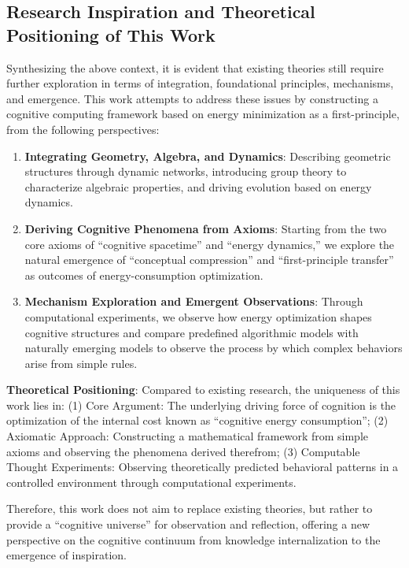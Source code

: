\documentclass[10pt,onecolumn]{article}
\begin{document}
\subsection{Research Inspiration and Theoretical Positioning of This Work}
\label{subsec:research_gaps_positioning}

Synthesizing the above context, it is evident that existing theories still require further exploration in terms of integration, foundational principles, mechanisms, and emergence. This work attempts to address these issues by constructing a cognitive computing framework based on energy minimization as a first-principle, from the following perspectives:
\begin{enumerate}
    \item \textbf{Integrating Geometry, Algebra, and Dynamics}: Describing geometric structures through dynamic networks, introducing group theory to characterize algebraic properties, and driving evolution based on energy dynamics.
    \item \textbf{Deriving Cognitive Phenomena from Axioms}: Starting from the two core axioms of “cognitive spacetime” and “energy dynamics,” we explore the natural emergence of “conceptual compression” and “first-principle transfer” as outcomes of energy-consumption optimization.
    \item \textbf{Mechanism Exploration and Emergent Observations}: Through computational experiments, we observe how energy optimization shapes cognitive structures and compare predefined algorithmic models with naturally emerging models to observe the process by which complex behaviors arise from simple rules.
\end{enumerate}

\textbf{Theoretical Positioning}: Compared to existing research, the uniqueness of this work lies in: (1) Core Argument: The underlying driving force of cognition is the optimization of the internal cost known as “cognitive energy consumption”; (2) Axiomatic Approach: Constructing a mathematical framework from simple axioms and observing the phenomena derived therefrom; (3) Computable Thought Experiments: Observing theoretically predicted behavioral patterns in a controlled environment through computational experiments.

Therefore, this work does not aim to replace existing theories, but rather to provide a “cognitive universe” for observation and reflection, offering a new perspective on the cognitive continuum from knowledge internalization to the emergence of inspiration.
\end{document}
